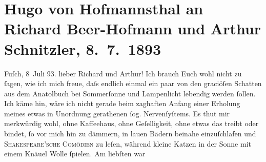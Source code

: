

               \section[Hugo von Hofmannsthal an Richard Beer-Hofmann und Arthur Schnitzler, 8. 7. 1893]{ Hugo von Hofmannsthal an Richard Beer-Hofmann und Arthur Schnitzler,
               8. 7. 1893}\nopagebreak{}\rehead{ }\begin{ledgroupsized}[t]{13cm}\normalsize\beginnumbering{} \toendnotes[C]{\smallbreak\pagebreak[2]} 
\pstart
           \raggedleft{}{\pb}Fuſch, 8 Juli 93.\pend
           \pstart{}lieber Richard und Arthur!\pend\pstart
           Ich brauch Euch wohl nicht zu ſagen, wie ich mich freue, daſs endlich einmal ein paar
               von den graciöſen Schatten aus dem Anatolbuch bei
               Sommerſonne und Lampenlicht lebendig werden ſollen. Ich käme hin, wäre ich nicht
               gerade beim zaghaften Anfang einer Erholung meines etwas in Unordnung gerathenen ſog.
               Nervenſyſtems.\pend
           \pstart
           Es thut mir merkwürdig wohl, ohne Kaffeehaus, ohne Geſelligkeit, ohne etwas das
               treibt oder bindet, ſo vor mich hin zu dämmern, {\pb}in
               lauen Bädern beinahe einzuſchlafen und \textsc{Shakespeare’sche Comödien} zu leſen,
               während kleine Katzen in der Sonne mit einem Knäuel Wolle ſpielen. Am liebſten war

\end{ledgroupsized}
